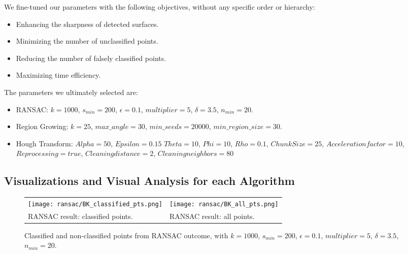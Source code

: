 \documentclass[a4paper,9pt]{article}
\begin{document}
We fine-tuned our parameters with the following objectives, without any specific order or hierarchy:
\begin{itemize}
    \item Enhancing the sharpness of detected surfaces.
    \item Minimizing the number of unclassified points.
    \item Reducing the number of falsely classified points.
    \item Maximizing time efficiency.
\end{itemize}

The parameters we ultimately selected are:
\begin{itemize}
    \item RANSAC: $k=1000$, $s_{min}=200$, $\epsilon=0.1$, $multiplier=5$, $\delta=3.5$, $n_{min}=20$.
    \item Region Growing: $k=25$, $max\_angle=30$, $min\_seeds=20000$, $min\_region\_size=30$.
    \item Hough Transform: $Alpha=50$, $Epsilon=0.15$ $Theta=10$, $Phi=10$, $Rho=0.1$, $Chunk Size=25$, $Acceleration factor=10$, $Reprocessing=true$, $Cleaning distance=2$, $Cleaning neighbors=80$
\end{itemize}

\subsection{Visualizations and Visual Analysis for each Algorithm}

\begin{figure}[H]
    \begin{tabularx}{\textwidth}{XX}
        \texttt{[image: ransac/BK\_classified\_pts.png]} & 
        \texttt{[image: ransac/BK\_all\_pts.png]} \\
        RANSAC result: classified points. & RANSAC result: all points. \\
    \end{tabularx}
    \caption{Classified and non-classified points from RANSAC outcome, with $k=1000$, $s_{min}=200$, $\epsilon=0.1$, $multiplier=5$, $\delta=3.5$, $n_{min}=20$.}
    \label{fig:ransac_viz_1}
\end{figure}
\end{document}
